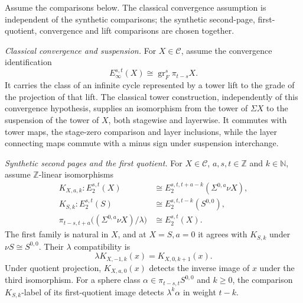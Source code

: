 \begin{definition}
\label{sem:AdamsSynthetic:adams-comparison-input}
\label{sem:AdamsSynthetic:selected-convergence}
\label{sem:AdamsSynthetic:classical-convergence-suspension}
\label{sem:AdamsSynthetic:synthetic-convergence}
\label{sem:AdamsSynthetic:e2-comparison}
\label{sem:AdamsSynthetic:normalized-map}
Assume the comparisons below. The classical convergence assumption is
independent of the synthetic comparisons; the synthetic second-page,
first-quotient, convergence and lift comparisons are chosen together.

\emph{Classical convergence and suspension.} For $X\in\mathcal C$, assume
the convergence identification
\[
 E_\infty^{s,t}(X)\cong\operatorname{gr}_F^s\pi_{t-s}X.
\]
It carries the class of an infinite cycle represented by a tower lift
to the grade of the projection of that lift. The
classical tower construction, independently of this convergence
hypothesis, supplies an isomorphism from the
tower of $\Sigma X$ to the suspension of the tower of $X$, both
stagewise and layerwise. It commutes with tower maps, the stage-zero
comparison and layer inclusions, while the layer connecting maps commute
with a minus sign under suspension interchange.

\emph{Synthetic second pages and the first quotient.}
For $X\in\mathcal C$, $a,s,t\in\mathbb Z$ and $k\in\mathbb N$,
assume $\mathbb Z$-linear isomorphisms
\[
 \begin{aligned}
 K_{X,a,k}:E_2^{s,t}(X)&\cong
   E_2^{s,t,t+a-k}(\Sigma^{0,a}\nu X),\\
 K_{S,k}:E_2^{s,t}(S)&\cong E_2^{s,t,t-k}(S^{0,0}),\\
 \pi_{t-s,t+a}\bigl((\Sigma^{0,a}\nu X)/\lambda\bigr)
   &\cong E_2^{s,t}(X).
 \end{aligned}
\]
The first family is natural in $X$, and at $X=S,a=0$ it agrees with
$K_{S,k}$ under $\nu S\cong S^{0,0}$.
Their $\lambda$ compatibility is
\[
 \lambda K_{X,-1,k}(x)=K_{X,0,k+1}(x).
\]
Under quotient projection, $K_{X,a,0}(x)$ detects
the inverse image of $x$ under the third isomorphism. For a sphere
class $\alpha\in\pi_{t-s,t}S^{0,0}$ and $k\ge0$, the comparison
$K_{S,k}$-label of its first-quotient image detects
$\lambda^k\alpha$ in weight $t-k$.


\end{definition}
